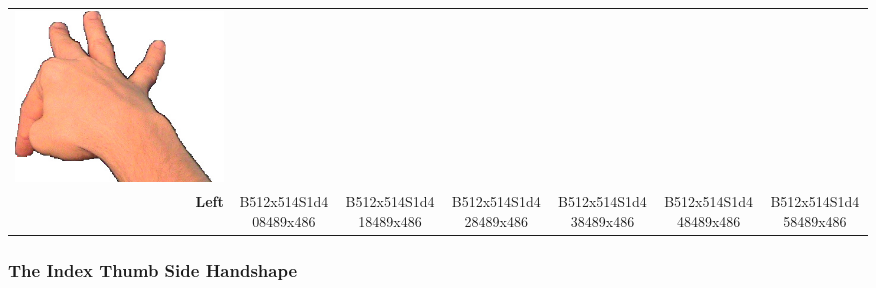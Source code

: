 \documentclass{article}
\begin{document}
\begin{center}
\begin{tabular}{r*{6}{c}}
\includegraphics[scale=0.1]{images/09-02-6.jpg}\\
\textbf{Left}&
B512x514S1d408489x486&
B512x514S1d418489x486&
B512x514S1d428489x486&
B512x514S1d438489x486&
B512x514S1d448489x486&
B512x514S1d458489x486\\
\end{tabular}
\end{center}

\subsubsection{The Index Thumb Side Handshape}
\end{document}

